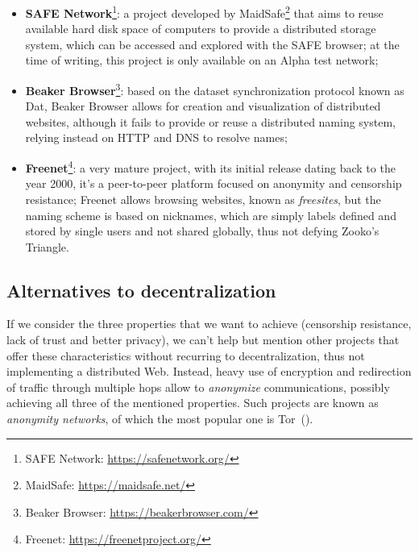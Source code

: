 \documentclass[mscthesis]{usiinfthesis}
\begin{document}
\begin{itemize}
	\item \textbf{SAFE Network}\footnote{SAFE Network: \url{https://safenetwork.org/}}: a project developed by MaidSafe\footnote{MaidSafe: \url{https://maidsafe.net/}} that aims to reuse available hard disk space of computers to provide a distributed storage system, which can be accessed and explored with the SAFE browser; at the time of writing, this project is only available on an Alpha test network;
	\item \textbf{Beaker Browser}\footnote{Beaker Browser: \url{https://beakerbrowser.com/}}: based on the dataset synchronization protocol known as Dat, Beaker Browser allows for creation and visualization of distributed websites, although it fails to provide or reuse a distributed naming system, relying instead on HTTP and DNS to resolve names;
	\item \textbf{Freenet}\footnote{Freenet: \url{https://freenetproject.org/}}: a very mature project, with its initial release dating back to the year 2000, it's a peer-to-peer platform focused on anonymity and censorship resistance; Freenet allows browsing websites, known as \emph{freesites}, but the naming scheme is based on nicknames, which are simply labels defined and stored by single users and not shared globally, thus not defying Zooko's Triangle.
\end{itemize}

\subsection{Alternatives to decentralization}\label{proj:tor}
If we consider the three properties that we want to achieve (censorship resistance, lack of trust and better privacy), we can't help but mention other projects that offer these characteristics without recurring to decentralization, thus not implementing a distributed Web. Instead, heavy use of encryption and redirection of traffic through multiple hops allow to \emph{anonymize} communications, possibly achieving all three of the mentioned properties. Such projects are known as \emph{anonymity networks}, of which the most popular one is Tor~(\cite{tor}).
\end{document}
